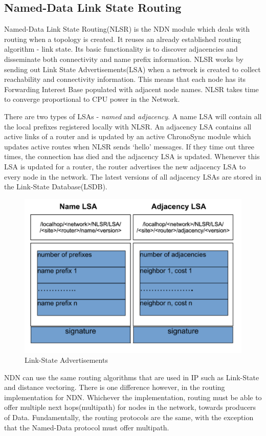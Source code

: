 \subsection{Named-Data Link State Routing}
Named-Data Link State Routing(NLSR) is the NDN module which deals with routing when a topology is created. It reuses an already established routing algorithm - link state. Its basic functionality is to discover adjacencies and disseminate both connectivity and name prefix information\cite{030}. NLSR works by sending out  Link State Advertisements(LSA) when a network is created to collect reachability and connectivity\cite{031} information. This means that each node has its Forwarding Interest Base populated with adjacent node names. NLSR takes time to converge proportional to CPU power in the Network. \par
There are two types of LSAs - \textit{named} and \textit{adjacency}. A name LSA will contain all the local prefixes registered locally with NLSR\cite{032}. An adjacency LSA contains all active links of a router and is updated by an active ChronoSync module which updates active routes when NLSR sends `hello' messages. If they time out three times, the connection has died and the adjacency LSA is updated. Whenever this LSA is updated for a router, the router advertises the new adjacency LSA to every node in the network. The latest versions of all adjacency LSAs are stored in the Link-State Database(LSDB).
\begin{figure}[ht]
\centering
\includegraphics[scale=1]{lsa.png}
\caption{Link-State Advertisements\cite{033}}
\end{figure}
NDN can use the same routing algorithms that are used in IP such as Link-State and distance vectoring. There is one difference however, in the routing implementation for NDN. Whichever the implementation, routing must be able to offer multiple next hops(multipath) for nodes in the network, towards producers of Data. Fundamentally, the routing protocols are the same, with the exception that the Named-Data protocol must offer multipath.\par

